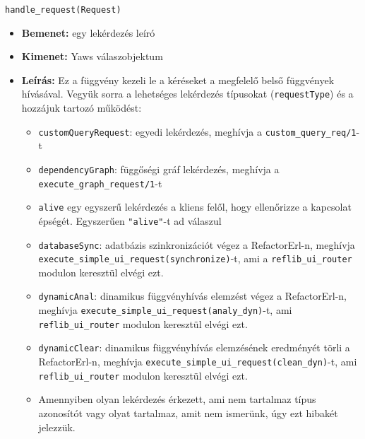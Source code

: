 \noindent \lstinline{handle_request(Request)}
\begin{itemize}
    \item \textbf{Bemenet:} egy lekérdezés leíró
    \item \textbf{Kimenet:} Yaws válaszobjektum
    \item \textbf{Leírás:} Ez a függvény kezeli le a kéréseket a megfelelő belső függvények hívásával. Vegyük sorra a lehetséges lekérdezés típusokat (\lstinline{requestType}) és a hozzájuk tartozó működést:
    \begin{itemize}
        \item \lstinline{customQueryRequest}: egyedi lekérdezés, meghívja a \lstinline{custom_query_req/1}-t
        
        \item \lstinline{dependencyGraph}: függőségi gráf lekérdezés, meghívja a \lstinline{execute_graph_request/1}-t
        
        \item \lstinline{alive}  egy egyszerű lekérdezés a kliens felől, hogy ellenőrizze a kapcsolat épségét. Egyszerűen \lstinline{"alive"}-t ad válaszul
        
        \item \lstinline{databaseSync}: adatbázis szinkronizációt végez a RefactorErl-n, meghívja \lstinline|execute_simple_ui_request(synchronize)|-t, ami a \lstinline{reflib_ui_router} modulon keresztül elvégi ezt.
        
        \item \lstinline{dynamicAnal}: dinamikus függvényhívás elemzést végez a RefactorErl-n, meghívja \lstinline|execute_simple_ui_request(analy_dyn)|-t, ami \lstinline{reflib_ui_router} modulon keresztül elvégi ezt.
        
        \item \lstinline{dynamicClear}: dinamikus függvényhívás elemzésének eredményét törli a RefactorErl-n, meghívja \lstinline|execute_simple_ui_request(clean_dyn)|-t, ami \lstinline{reflib_ui_router} modulon keresztül elvégi ezt.
        
        \item Amennyiben olyan lekérdezés érkezett, ami nem tartalmaz típus azonosítót vagy olyat tartalmaz, amit nem ismerünk, úgy ezt hibakét jelezzük.
        
    \end{itemize}
\end{itemize} \\



